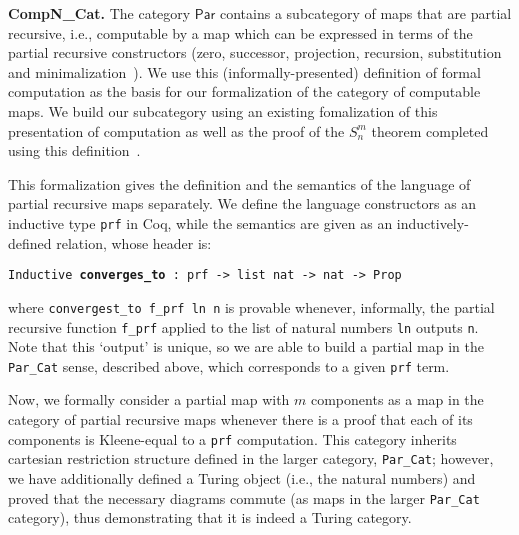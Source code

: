 \documentclass{entcs} \usepackage{entcsmacro}
\begin{document}
{\bfseries CompN\_Cat.} The category $\mathsf{Par}$ contains a subcategory of maps that are partial recursive, i.e., computable by a map which can be expressed in terms of the partial recursive constructors (zero, successor, projection, recursion, substitution and minimalization~\cite{Computability}). We use this (informally-presented) definition of formal computation as the basis for our formalization of the category of computable maps. We build our subcategory using an existing fomalization of this presentation of computation as well as the proof of the $S^m_n$ theorem completed using this definition~\cite{SmnForm}.

This formalization gives the definition and the semantics of the
language of partial recursive maps separately. We define the language
constructors as an inductive type {\tt prf} in Coq, while the
semantics are given as an inductively-defined relation, whose header is:

{\tt \small Inductive {\bfseries converges\_to} : prf -> list nat -> nat -> Prop} 

\noindent where {\tt convergest\_to f\_prf ln n} is provable whenever,
informally, the partial recursive function {\tt f\_prf} applied to the
list of natural numbers {\tt ln} outputs {\tt n}. Note that this
`output' is unique, so we are able to build a partial map in the {\tt
  Par\_Cat} sense, described above, which corresponds to a given {\tt prf} term. 

Now, we formally consider a partial map with $m$ components as a map in the category of partial recursive maps whenever there is a proof that each of its components is Kleene-equal to a {\tt prf} computation. This category inherits cartesian restriction structure defined in the larger category, {\tt Par\_Cat}; however, we have additionally defined a Turing object (i.e., the natural numbers) and proved that the necessary diagrams commute (as maps in the larger {\tt Par\_Cat} category), thus demonstrating that it is indeed a Turing category.
\end{document}
